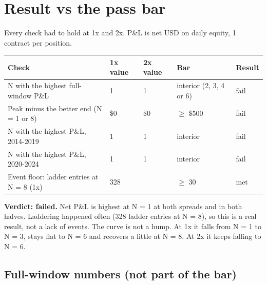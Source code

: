 \documentclass{article}
\begin{document}
\section{Result vs the pass bar}

Every check had to hold at 1x and 2x. P\&L is net USD on daily equity, 1 contract per position.

\begin{center}\small
\begin{tabularx}{\linewidth}{>{\raggedright\arraybackslash}X l l >{\raggedright\arraybackslash}X l}
\toprule
\textbf{Check} & \textbf{1x value} & \textbf{2x value} & \textbf{Bar} & \textbf{Result} \\
\midrule
N with the highest full-window P\&L & 1 & 1 & interior (2, 3, 4 or 6) & fail \\
Peak minus the better end (N = 1 or 8) & \$0 & \$0 & \ensuremath{\geq} \$500 & fail \\
N with the highest P\&L, 2014-2019 & 1 & 1 & interior & fail \\
N with the highest P\&L, 2020-2024 & 1 & 1 & interior & fail \\
Event floor: ladder entries at N = 8 (1x) & 328 &  & \ensuremath{\geq} 30 & met \\
\bottomrule
\end{tabularx}
\end{center}

\textbf{Verdict: failed.} Net P\&L is highest at N = 1 at both spreads and in both halves. Laddering happened often (328 ladder entries at N = 8), so this is a real result, not a lack of events. The curve is not a hump. At 1x it falls from N = 1 to N = 3, stays flat to N = 6 and recovers a little at N = 8. At 2x it keeps falling to N = 6.

\subsection{Full-window numbers (not part of the bar)}
\end{document}
